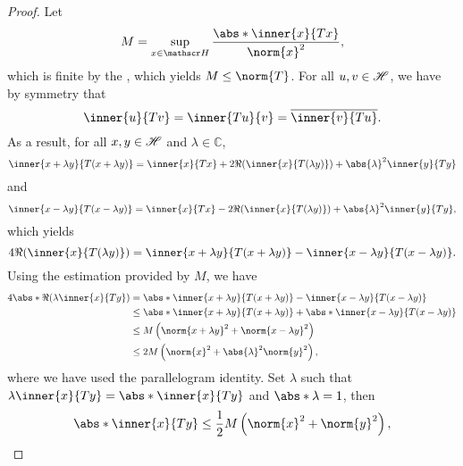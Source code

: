 \begin{proof}
    Let
    \begin{equation*}
        M = \sup_{x \in \hilbert}{\frac{\abs*{\inner{x}{Tx}}}{\norm{x}^2}},
    \end{equation*}
    which is finite by the , which yields \(M \leq \norm{T}\). For all \(u, v \in \mathscr{H}\), we have by symmetry that
    \begin{equation*}
        \inner{u}{Tv} = \inner{Tu}{v} = \conj{\inner{v}{Tu}}.
    \end{equation*}
    As a result, for all \(x, y \in \mathscr{H}\) and \(\lambda \in \mathbb{C}\),
    \begin{equation*}
        \inner{x + \lambda y}{T(x + \lambda y)} = \inner{x}{Tx} + 2\Re{\left(\inner{x}{T(\lambda y)}\right)}+ \abs{\lambda}^2 \inner{y}{Ty}
    \end{equation*}
    and
    \begin{equation*}
        \inner{x - \lambda y}{T(x - \lambda y)} = \inner{x}{Tx} - 2\Re{\left(\inner{x}{T(\lambda y)}\right)} + \abs{\lambda}^2 \inner{y}{Ty},
    \end{equation*}
    which yields
    \begin{equation*}
        4 \Re{\left(\inner{x}{T(\lambda y)}\right)} = \inner{x + \lambda y}{T(x + \lambda y)} - \inner{x - \lambda y}{T(x - \lambda y)}.
    \end{equation*}
    Using the estimation provided by \(M\), we have
    \begin{align*}
        4\abs*{\Re{\left(\lambda \inner{x}{Ty}\right)}} &= \abs*{\inner{x + \lambda y}{T(x + \lambda y)} - \inner{x - \lambda y}{T(x - \lambda y)}}\\
                                                        &\leq \abs*{\inner{x + \lambda y}{T(x + \lambda y)}} + \abs*{\inner{x - \lambda y}{T(x - \lambda y)}}\\
                                                        &\leq M\left(\norm{x + \lambda y}^2 + \norm{x - \lambda y}^2\right)\\
                                                        &\leq 2M\left(\norm{x}^2 + \abs{\lambda}^2 \norm{y}^2\right),
    \end{align*}
    where we have used the parallelogram identity. Set \(\lambda\) such that \(\lambda \inner{x}{Ty} = \abs*{\inner{x}{Ty}}\) and \(\abs*{\lambda} = 1\), then
    \begin{equation*}
        \abs*{\inner{x}{Ty}} \leq \frac12 M \left(\norm{x}^2 + \norm{y}^2\right),

\end{equation*}
\end{proof}
